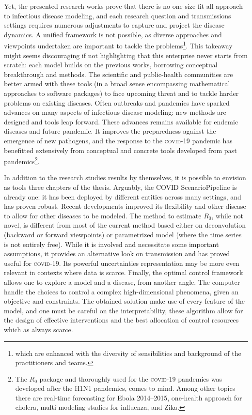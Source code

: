 Yet, the presented research works prove that there is no one-size-fit-all approach to infectious disease modeling, and each research question and transmissions settings requires numerous adjustments to capture and project the disease dynamics. A unified framework is not possible, as diverse approaches and viewpoints undertaken are important to tackle the problems\footnote{which are enhanced with the diversity of sensibilities and background of the practitioners and teams.}.  
  This takeaway might seems discouraging if not highlighting that this enterprise never starts from scratch: each model builds on the previous works, borrowing conceptual breakthrough and methods. The scientific and public-health communities are better armed with these tools (in a broad sense encompassing \eg mathematical approaches to software packages) to face upcoming threat and to tackle harder problems on existing diseases. Often outbreaks and pandemics have sparked advances on many aspects of infectious disease modeling: new methods are designed and tools leap forward. These advances remains available for endemic diseases and future pandemic. It improves the preparedness against the emergence of new pathogens, and the response to the \textsc{covid}-19 pandemic has benefitted extensively from conceptual and concrete tools developed from past pandemics\footnote{The $R_0$ package and thoroughly used for the \textsc{covid}-19 pandemics was developed after the H1N1 pandemics, comes to mind. Among other topics there are \eg real-time forecasting for Ebola 2014--2015, one-health approach for cholera, multi-modeling studies for influenza, and Zika.}. 
  
  In addition to the research studies results by themselves, it is possible to envision as tools three chapters of the thesis. Arguably, the COVID ScenarioPipeline is already one: it has been deployed by different entities across many settings, and has proven robust. Recent developments improved its flexibility and other disease  to allow for other diseases to be modeled. The method to estimate $R_0$, while not novel, is different from most of the current method based either on deconvolution (backward or forward viewpoints) or parametrized model (where the time series is not entirely free). While it is involved and necessitate some important assumptions, it provides an alternative look on transmission and has proved useful for \textsc{covid}-19. Its powerful uncertainties representation may be more even relevant in contexts where data is scarce. 
Finally, the optimal control framework allows one to explore a model and a disease, from another angle. The computer handle the choices to control a complex high-dimensional  phenomena, given an objective and constraints. The obtained solution make use of every feature of the model, and one must be careful on the interpretability, these algorithm allow for the design of effective interventions and the best allocation of control resources which as always scarce.

